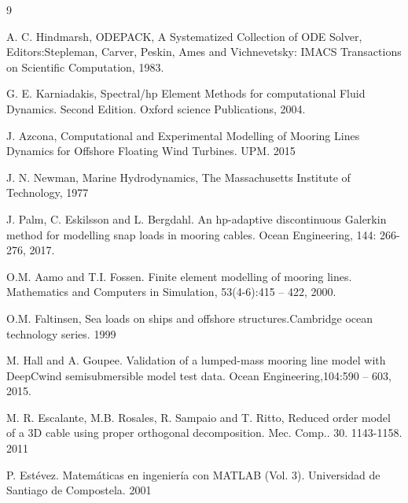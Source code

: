 \documentclass[10pt] {article}
\begin{document}
\begin{thebibliography}{9}
	
A. C. Hindmarsh, ODEPACK, A Systematized Collection of ODE Solver, Editors:Stepleman, Carver, Peskin, Ames and Vichnevetsky: IMACS Transactions on Scientific Computation, 1983.

G. E. Karniadakis, Spectral/hp Element Methods for computational Fluid Dynamics. Second Edition. Oxford science Publications, 2004.

J. Azcona, Computational and Experimental Modelling of Mooring Lines Dynamics for Offshore Floating Wind Turbines. UPM. 2015

J. N. Newman, Marine Hydrodynamics, The Massachusetts Institute of Technology, 1977

J. Palm, C. Eskilsson and L. Bergdahl. An hp-adaptive discontinuous Galerkin method for modelling snap loads in mooring cables. Ocean Engineering, 144: 266-276, 2017.

O.M. Aamo and T.I. Fossen. Finite element modelling of mooring lines. Mathematics and Computers in Simulation, 53(4-6):415 – 422, 2000.

O.M. Faltinsen, Sea loads on ships and offshore structures.Cambridge ocean technology series. 1999

M. Hall and A. Goupee. Validation of a lumped-mass mooring line model with DeepCwind semisubmersible model test data. Ocean Engineering,104:590 – 603, 2015.

M. R. Escalante, M.B. Rosales, R. Sampaio and T. Ritto, Reduced order model of a 3D cable using proper orthogonal decomposition. Mec. Comp.. 30. 1143-1158. 2011

P. Est\'evez. Matemáticas en ingeniería con MATLAB (Vol. 3). Universidad de Santiago de Compostela. 2001


\end{thebibliography}
\end{document}
